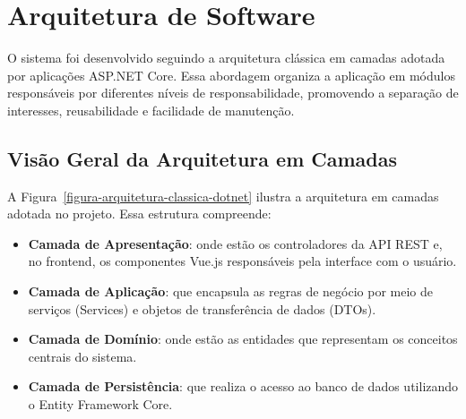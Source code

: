 \chapter{Arquitetura de Software}
\label{sec-arquitetura}
\vspace{-1cm} %

O sistema \emph{\imprimirtitulo} foi desenvolvido seguindo a arquitetura clássica em camadas adotada por aplicações ASP.NET Core. Essa abordagem organiza a aplicação em módulos responsáveis por diferentes níveis de responsabilidade, promovendo a separação de interesses, reusabilidade e facilidade de manutenção.

\section{Visão Geral da Arquitetura em Camadas}

A Figura~\ref{figura-arquitetura-classica-dotnet} ilustra a arquitetura em camadas adotada no projeto. Essa estrutura compreende:

\begin{itemize}
    \item \textbf{Camada de Apresentação}: onde estão os controladores da API REST e, no frontend, os componentes Vue.js responsáveis pela interface com o usuário.
    \item \textbf{Camada de Aplicação}: que encapsula as regras de negócio por meio de serviços (Services) e objetos de transferência de dados (DTOs).
    \item \textbf{Camada de Domínio}: onde estão as entidades que representam os conceitos centrais do sistema.
    \item \textbf{Camada de Persistência}: que realiza o acesso ao banco de dados utilizando o Entity Framework Core.
\end{itemize}

